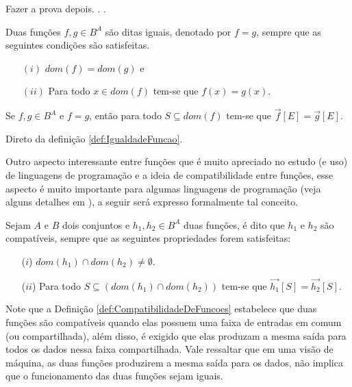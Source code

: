 \begin{prova}
	{\color{red} Fazer a prova depois. . .}
\end{prova}

\begin{definicao}\label{def:IgualdadeFuncao}
	Duas funções $f, g \in B^A$ são ditas iguais, denotado por $f = g$, sempre que as seguintes condições são satisfeitas.
	\begin{itemize}
		\item[$(i)$] $dom(f) = dom(g)$ e 
		\item[$(ii)$] Para todo $x \in dom(f)$ tem-se que $f(x) = g(x)$.
	\end{itemize}
\end{definicao}

\begin{teorema}
	Se $f, g \in B^A$ e $f = g$, então para todo $S \subseteq dom(f)$ tem-se que $\overrightarrow{f}[E] = \overrightarrow{g}[E]$. 
\end{teorema}

\begin{prova}
	Direto da definição \ref{def:IgualdadeFuncao}.
\end{prova}

Outro aspecto interessante entre funções que é muito apreciado no estudo (e uso) de linguagens de programação e a ideia de compatibilidade entre funções, esse aspecto é muito importante para algumas linguagens de programação (veja alguns detalhes em \cite{ibmFC}), a seguir será expresso formalmente tal conceito.

\begin{definicao}\label{def:CompatibilidadeDeFuncoes}
	Sejam $A$ e $B$ dois conjuntos e $h_1, h_2 \in B^A$ duas funções, é dito que $h_1$ e $h_2$ são compatíveis, sempre que as seguintes propriedades forem satisfeitas:
	\begin{itemize}
		\item[($i$)] $dom(h_1) \cap dom(h_2) \neq \emptyset$.
		\item[($ii$)] Para todo $S \subseteq (dom(h_1) \cap dom(h_2))$  tem-se que $\overrightarrow{h_1}[S] = \overrightarrow{h_2}[S]$.
	\end{itemize}
\end{definicao}

Note que a Definição \ref{def:CompatibilidadeDeFuncoes} estabelece que duas funções são compatíveis quando elas possuem uma faixa de entradas em comum (ou compartilhada), além disso, é exigido que elas produzam a mesma saída para todos os dados nessa faixa compartilhada. Vale ressaltar que em uma visão de máquina, as duas funções produzirem a mesma saída para os dados, não implica que o funcionamento das duas funções sejam iguais.


